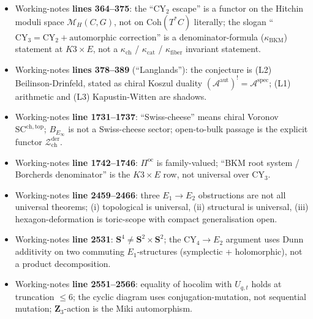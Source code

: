 \documentclass[11pt]{amsart}
\theoremstyle{definition}
\providecommand{\kch}{\kappa_{\mathrm{ch}}}
\providecommand{\kcat}{\kappa_{\mathrm{cat}}}
\providecommand{\kBKM}{\kappa_{\mathrm{BKM}}}
\providecommand{\CY}{\mathrm{CY}}
\providecommand{\Coh}{\mathrm{Coh}}
\providecommand{\Eone}{E_1}
\providecommand{\Etwo}{E_2}
\providecommand{\Einf}{E_\infty}
\providecommand{\cM}{\mathcal{M}}
\providecommand{\cZ}{\mathcal{Z}}
\providecommand{\bZ}{\mathbf{Z}}
\providecommand{\bS}{\mathbf{S}}
\begin{document}
\begin{itemize}
 \item Working-notes \textbf{lines 364--375}: the ``$\CY_2$ escape'' is
   a functor on the Hitchin moduli space $\cM_H(C,G)$, not on
   $\Coh(T^*C)$ literally; the slogan
   ``$\CY_3 = \CY_2 + \text{automorphic correction}$'' is a
   denominator-formula ($\kBKM$) statement at $K3 \times E$, not a
   $\kch$ / $\kcat$ / $\kappa_{\mathrm{fiber}}$ invariant statement.
 \item Working-notes \textbf{lines 378--389} (``Langlands''): the
   conjecture is (L2) Beilinson-Drinfeld, stated as chiral Koszul
   duality $(\mathcal{A}^{\mathrm{aut}})^! = \mathcal{A}^{\mathrm{spec}}$; (L1)
   arithmetic and (L3) Kapustin-Witten are shadows.
 \item Working-notes \textbf{line 1731--1737}: ``Swiss-cheese'' means
   chiral Voronov $\mathrm{SC}^{\mathrm{ch,top}}$; $B_{\Einf}$ is not
   a Swiss-cheese sector; open-to-bulk passage is the explicit
   functor $\cZ^{\mathrm{der}}_{\mathrm{ch}}$.
 \item Working-notes \textbf{line 1742--1746}: $\Pi^{\mathrm{oc}}$
   is family-valued; ``BKM root system / Borcherds denominator'' is
   the $K3 \times E$ row, not universal over CY$_3$.
 \item Working-notes \textbf{line 2459--2466}: three
   $\Eone \to \Etwo$ obstructions are not all universal theorems; (i)
   topological is universal, (ii) structural is universal, (iii)
   hexagon-deformation is toric-scope with compact generalisation
   open.
 \item Working-notes \textbf{line 2531}: $\bS^4 \neq \bS^2 \times \bS^2$;
   the CY$_4 \to \Etwo$ argument uses Dunn additivity on two
   commuting $\Eone$-structures (symplectic + holomorphic), not a
   product decomposition.
 \item Working-notes \textbf{line 2551--2566}: equality of hocolim
   with $U_{q,t}$ holds at truncation $\leq 6$; the cyclic diagram
   uses conjugation-mutation, not sequential mutation; $\bZ_3$-action
   is the Miki automorphism.
\end{itemize}
\end{document}
